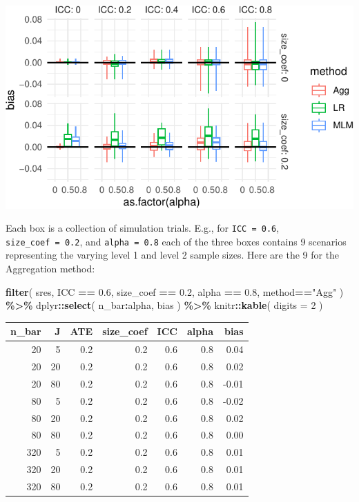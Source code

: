 \documentclass[
]{book}
\newenvironment{Shaded}{\begin{snugshade}}{\end{snugshade}}
\newcommand{\AttributeTok}[1]{\textcolor[rgb]{0.13,0.29,0.53}{#1}}
\newcommand{\DecValTok}[1]{\textcolor[rgb]{0.00,0.00,0.81}{#1}}
\newcommand{\FloatTok}[1]{\textcolor[rgb]{0.00,0.00,0.81}{#1}}
\newcommand{\FunctionTok}[1]{\textcolor[rgb]{0.13,0.29,0.53}{\textbf{#1}}}
\newcommand{\NormalTok}[1]{#1}
\newcommand{\SpecialCharTok}[1]{\textcolor[rgb]{0.81,0.36,0.00}{\textbf{#1}}}
\newcommand{\StringTok}[1]{\textcolor[rgb]{0.31,0.60,0.02}{#1}}
\begin{document}
\begin{center}\includegraphics[width=0.75\linewidth]{Designing-Simulations-in-R_files/figure-latex/clusterRCT_plot_bias_v1-1} \end{center}

Each box is a collection of simulation trials. E.g., for \texttt{ICC\ =\ 0.6}, \texttt{size\_coef\ =\ 0.2}, and \texttt{alpha\ =\ 0.8} each of the three boxes contains 9 scenarios representing the varying level 1 and level 2 sample sizes.
Here are the 9 for the Aggregation method:

\begin{Shaded}
\begin{Highlighting}[]
\FunctionTok{filter}\NormalTok{( sres, }
\NormalTok{        ICC }\SpecialCharTok{==} \FloatTok{0.6}\NormalTok{, }
\NormalTok{        size\_coef }\SpecialCharTok{==} \FloatTok{0.2}\NormalTok{,}
\NormalTok{        alpha }\SpecialCharTok{==} \FloatTok{0.8}\NormalTok{, method}\SpecialCharTok{==}\StringTok{"Agg"}\NormalTok{ ) }\SpecialCharTok{\%\textgreater{}\%}
\NormalTok{  dplyr}\SpecialCharTok{::}\FunctionTok{select}\NormalTok{( n\_bar}\SpecialCharTok{:}\NormalTok{alpha, bias ) }\SpecialCharTok{\%\textgreater{}\%}
\NormalTok{  knitr}\SpecialCharTok{::}\FunctionTok{kable}\NormalTok{( }\AttributeTok{digits =} \DecValTok{2}\NormalTok{ )}
\end{Highlighting}
\end{Shaded}

\begin{tabular}{r|r|r|r|r|r|r}
\hline
n\_bar & J & ATE & size\_coef & ICC & alpha & bias\\
\hline
20 & 5 & 0.2 & 0.2 & 0.6 & 0.8 & 0.04\\
\hline
20 & 20 & 0.2 & 0.2 & 0.6 & 0.8 & 0.02\\
\hline
20 & 80 & 0.2 & 0.2 & 0.6 & 0.8 & -0.01\\
\hline
80 & 5 & 0.2 & 0.2 & 0.6 & 0.8 & -0.02\\
\hline
80 & 20 & 0.2 & 0.2 & 0.6 & 0.8 & 0.02\\
\hline
80 & 80 & 0.2 & 0.2 & 0.6 & 0.8 & 0.00\\
\hline
320 & 5 & 0.2 & 0.2 & 0.6 & 0.8 & 0.01\\
\hline
320 & 20 & 0.2 & 0.2 & 0.6 & 0.8 & 0.01\\
\hline
320 & 80 & 0.2 & 0.2 & 0.6 & 0.8 & 0.01\\
\hline
\end{tabular}
\end{document}

